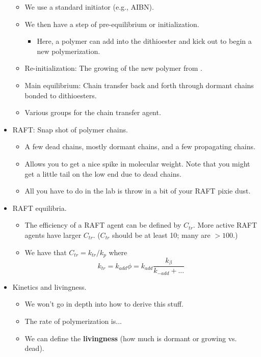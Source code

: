 \documentclass[../notes.tex]{subfiles}
\begin{document}
\begin{itemize}
\begin{itemize}
        \item We use a standard initiator (e.g., AIBN).
        \item We then have a step of pre-equilibrium or initialization.
        \begin{itemize}
            \item Here, a polymer can add into the dithioester and kick out  to begin a new polymerization.
        \end{itemize}
        \item Re-initialization: The growing of the new polymer from .
        \item Main equilibrium: Chain transfer back and forth through dormant chains bonded to dithioesters.
        \item Various  groups for the chain transfer agent.
    \end{itemize}
    \item RAFT: Snap shot of polymer chains.
    \begin{itemize}
        \item A few dead chains, mostly dormant chains, and a few propagating chains.
        \item Allows you to get a nice spike in molecular weight. Note that you might get a little tail on the low end due to dead chains.
        \item All you have to do in the lab is throw in a bit of your RAFT pixie dust.
    \end{itemize}
    \item RAFT equilibria.
    \begin{itemize}
        \item The efficiency of a RAFT agent can be defined by $C_{tr}$. More active RAFT agents have larger $C_{tr}$. ($C_{tr}$ should be at least 10; many are $>100$.)
        \item We have that $C_{tr}=k_{tr}/k_p$ where
        \begin{equation*}
            k_{tr} = k_{add}\phi
            = k_{add}\frac{k_\beta}{k_{-add}+...}
        \end{equation*}
    \end{itemize}
    \item Kinetics and livingness.
    \begin{itemize}
        \item We won't go in depth into how to derive this stuff.
        \item The rate of polymerization is...
        \item We can define the \textbf{livingness} (how much is dormant or growing vs. dead).

\end{itemize}
\end{itemize}
\end{document}
